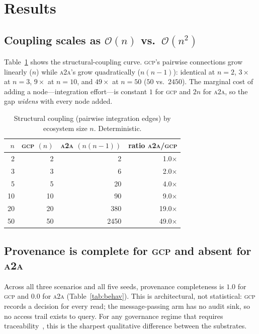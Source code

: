 \documentclass[10pt,twocolumn,letterpaper]{article}
\newcommand{\gcp}{\textsc{gcp}}
\newcommand{\ata}{\textsc{a2a}}
\newcommand{\bigoh}{\mathcal{O}}
\begin{document}
\section{Results}
\label{sec:results}

\subsection{Coupling scales as $\bigoh(n)$ vs.\ $\bigoh(n^2)$}
Table~\ref{tab:struct} shows the structural-coupling curve. \gcp{}'s pairwise connections grow
linearly ($n$) while \ata{}'s grow quadratically ($n(n{-}1)$): identical at $n{=}2$, $3\times$ at
$n{=}3$, $9\times$ at $n{=}10$, and $49\times$ at $n{=}50$ ($50$ vs.\ $2450$). The marginal cost of
adding a node---integration effort---is constant $1$ for \gcp{} and $2n$ for \ata{}, so the gap
\emph{widens} with every node added.

\begin{table}[t]
\centering
\caption{Structural coupling (pairwise integration edges) by ecosystem size $n$. Deterministic.}
\label{tab:struct}
\begin{tabular}{rrrr}
\toprule
$n$ & \gcp{} $(n)$ & \ata{} $(n(n{-}1))$ & ratio \ata{}/\gcp{} \\
\midrule
2  & 2  & 2    & 1.0$\times$ \\
3  & 3  & 6    & 2.0$\times$ \\
5  & 5  & 20   & 4.0$\times$ \\
10 & 10 & 90   & 9.0$\times$ \\
20 & 20 & 380  & 19.0$\times$ \\
50 & 50 & 2450 & 49.0$\times$ \\
\bottomrule
\end{tabular}
\end{table}

\subsection{Provenance is complete for \gcp{} and absent for \ata{}}
Across all three scenarios and all five seeds, provenance completeness is $1.0$ for \gcp{} and $0.0$
for \ata{} (Table~\ref{tab:behav}). This is architectural, not statistical: \gcp{} records a decision
for every read; the message-passing arm has no audit sink, so no access trail exists to query. For any
governance regime that requires traceability~\citep{ojewale2025audit,owasp2025}, this is the sharpest
qualitative difference between the substrates.
\end{document}
